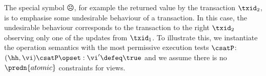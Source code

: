 The special symbol \(\sadface\), for example the returned value by the transaction $\txid_2$, is to emphasise some undesirable behaviour of a transaction.
In this case, the undesirable behaviour corresponds to the transaction to the right \( \txid_{2} \) observing only one of the updates from \( \txid_{1} \). 
To illustrate this, we instantiate the operation semantics with the most permissive execution tests \( \csatP \): \( (\hh, \vi) \csatP \opset : \vi'  \defeq  \true \) and we assume there is no \( \predn{atomic} \) constraints for views.


